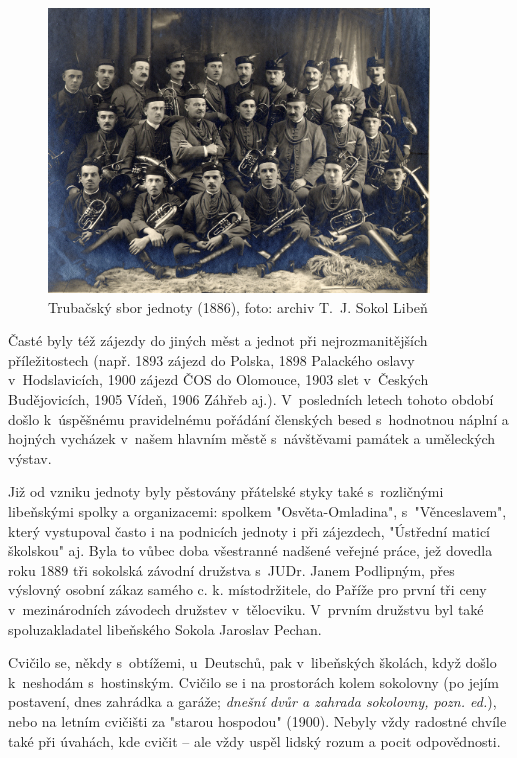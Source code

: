 \documentclass[a5paper, 12pt, twoside]{article}
\newcommand{\pozned}[1]{%
\textit{#1}}
\begin{document}
\begin{figure}[h!]
  \centering
  \includegraphics[width=0.9\textwidth]{img/trubaci.jpg}
  \caption*{Trubačský sbor jednoty (1886), foto: archiv T.~J. Sokol Libeň}
\end{figure}

Časté byly též zájezdy do jiných měst a jednot při nejrozmanitějších příležitostech (např. 1893 zájezd do Polska, 1898 Palackého oslavy v~Hodslavicích, 1900 zájezd ČOS do Olomouce, 1903 slet v~Českých Budějovicích, 1905 Vídeň, 1906 Záhřeb aj.). V~posledních letech tohoto období došlo k~úspěšnému pravidelnému pořádání členských besed s~hodnotnou náplní a hojných vycházek v~našem hlavním městě s~návštěvami památek a uměleckých výstav.

Již od vzniku jednoty byly pěstovány přátelské styky také s~rozličnými libeňskými spolky a organizacemi: spolkem "Osvěta-Omladina", s~"Věnceslavem", který vystupoval často i na podnicích jednoty i při zájezdech, "Ústřední maticí školskou" aj. Byla to vůbec doba všestranné nadšené veřejné práce, jež dovedla roku 1889 tři sokolská závodní družstva s~JUDr. Janem Podlipným, přes výslovný osobní zákaz samého c. k. místodržitele, do Paříže pro první tři ceny v~mezinárodních závodech družstev v~tělocviku. V~prvním družstvu byl také spoluzakladatel libeňského Sokola Jaroslav Pechan.

Cvičilo se, někdy s~obtížemi, u~Deutschů, pak v~libeňských školách, když došlo k~neshodám s~hostinským. Cvičilo se i na prostorách kolem sokolovny (po jejím postavení, dnes zahrádka a garáže; \pozned{dnešní dvůr a zahrada sokolovny, pozn. ed.}), nebo na letním cvičišti za "starou hospodou" (1900). Nebyly vždy radostné chvíle také při úvahách, kde cvičit – ale vždy uspěl lidský rozum a pocit odpovědnosti. 
\end{document}
